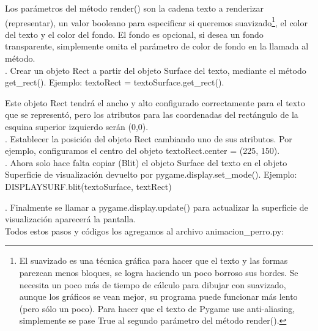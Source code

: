 Los parámetros del método {\ttfamily  render()} son la cadena  texto a renderizar (representar), un valor booleano
para especificar si queremos suavizado\footnote{El suavizado es una técnica gráfica para hacer que el texto y las formas parezcan menos bloques, se logra haciendo un poco borroso sus bordes. Se necesita un poco más de tiempo de cálculo para dibujar con suavizado,
aunque los gráficos se vean mejor, su programa puede funcionar más lento (pero sólo un poco).
Para hacer que el texto de Pygame use anti-aliasing, simplemente se pase True al segundo parámetro del
método render().}, el color del texto y el
color del fondo. El fondo es opcional, si desea un fondo transparente, simplemente omita el parámetro de color de fondo en la llamada al método.\\


. Crear un objeto  {\ttfamily  Rect} a partir del objeto Surface del texto, mediante el método {\ttfamily get\_rect()}. 
Ejemplo: {\ttfamily textoRect = textoSurface.get\_rect()}. 

Este objeto  {\ttfamily Rect} tendrá el ancho y alto configurado 
correctamente para el texto que se representó, pero los atributos para las coordenadas del rectángulo de la esquina superior 
izquierdo serán (0,0).\\

. Establecer la posición del objeto {\ttfamily  Rect} cambiando uno de sus atributos. Por ejemplo,  configuramos el centro del objeto {\ttfamily   textoRect.center = (225, 150)}.\\


. Ahora solo hace falta copiar (Blit) el objeto Surface del texto en el objeto Superficie de visualización devuelto por
{\ttfamily  pygame.display.set\_mode()}.  Ejemplo: {\ttfamily DISPLAYSURF.blit(textoSurface, textRect)}

. Finalmente se llamar  a {\ttfamily pygame.display.update()} para actualizar la superficie de visualización aparecerá la pantalla.\\


Todos estos pasos y códigos los agregamos al archivo {\ttfamily animacion\_perro.py}:

\hspace{-2.9cm}{\ttfamily \scriptsize animacion}

